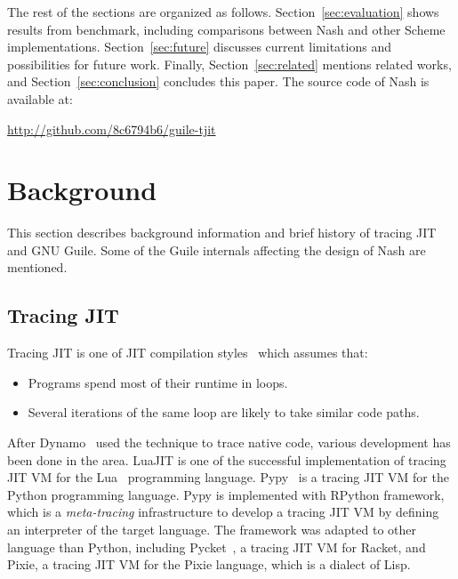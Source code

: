 \documentclass[preprint, 10pt]{sigplanconf}
\begin{document}
The rest of the sections are organized as follows.
Section~\hyperref[sec:evaluation]{\ref{sec:evaluation}} shows results from
benchmark, including comparisons between Nash and other Scheme
implementations. Section~\hyperref[sec:conclusion]{\ref{sec:future}} discusses
current limitations and possibilities for future work. Finally,
Section~\hyperref[sec:related]{\ref{sec:related}} mentions related works, and
Section~\hyperref[sec:conclusion]{\ref{sec:conclusion}} concludes this paper.
The source code of Nash is available at:

\begin{center}
  \url{http://github.com/8c6794b6/guile-tjit}
\end{center}

\section{Background}
\label{sec:background}

This section describes background information and brief history of tracing JIT
and GNU Guile. Some of the Guile internals affecting the design of Nash are
mentioned.

\subsection{Tracing JIT}
Tracing JIT is one of JIT compilation styles~\cite{bolz2009tracing} which
assumes that:

\begin{itemize}
\item Programs spend most of their runtime in loops.
\item Several iterations of the same loop are likely to take similar code
  paths.
\end{itemize}

After Dynamo~\cite{bala2000dynamo} used the technique to trace native code,
various development has been done in the area. LuaJIT is one of the successful
implementation of tracing JIT VM for the Lua~\cite{ierusalimschy1996lua}
programming language. Pypy~\cite{bolz2009tracing} is a tracing JIT VM for the
Python programming language. Pypy is implemented with RPython framework, which
is a \textit{meta-tracing} infrastructure to develop a tracing JIT VM by
defining an interpreter of the target language. The framework was adapted to
other language than Python, including Pycket~\citep{bauman2015pycket}, a
tracing JIT VM for Racket, and Pixie, a tracing JIT VM for the Pixie language,
which is a dialect of Lisp.
\end{document}
